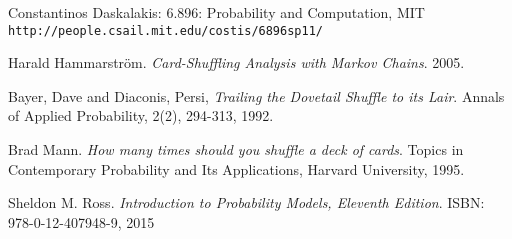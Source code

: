 \documentclass[a4paper, 11pt]{article}
\theoremstyle{definition}
\begin{document}
\begin{thebibliography}{9}
Constantinos Daskalakis: 6.896: Probability and Computation, MIT
\\\texttt{http://people.csail.mit.edu/costis/6896sp11/}

Harald Hammarstr\"om.
\textit{Card-Shuffling Analysis with Markov Chains}. 
2005.
 
Bayer, Dave and Diaconis, Persi, 
\textit{Trailing the Dovetail Shuffle to its Lair}. Annals of Applied Probability, 2(2), 294-313, 1992.

Brad Mann. 
\textit{How many times should you shuffle a deck of cards}. 
Topics in Contemporary Probability and Its Applications, Harvard University, 1995.

Sheldon M. Ross.
\textit{Introduction to Probability Models, Eleventh Edition}. ISBN: 978-0-12-407948-9, 2015

\end{thebibliography}
\end{document}
